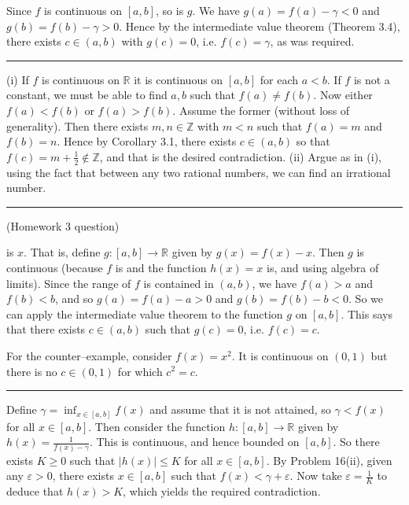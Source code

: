 \documentclass[letterpaper,10pt,english]{jupyterBook}
\begin{document}
\sphinxAtStartPar
{\hyperref[\detokenize{Problems:id24}]{}} Since \(f\) is continuous on \([a, b]\), so is \(g\). We have \(g(a) = f(a) - \gamma < 0\) and \(g(b) = f(b) - \gamma > 0\). Hence by the intermediate value theorem (Theorem 3.4), there exists \(c \in (a, b)\) with \(g(c) = 0\), i.e. \(f(c) = \gamma\), as was required.


\bigskip\hrule\bigskip


\sphinxAtStartPar
{\hyperref[\detokenize{Problems:id25}]{}}
(i) If \(f\) is continuous on \(\mathbb{R}\) it is continuous on \([a, b]\) for each \(a < b\). If \(f\) is not a constant, we must be able to find \(a, b\) such that \(f(a) \neq f(b)\). Now either \(f(a) < f(b)\) or \(f(a) > f(b)\). Assume the former (without loss of generality). Then there exists \(m, n \in \mathbb{Z}\) with \(m < n\) such that \(f(a) = m\) and \(f(b) = n\). Hence by Corollary 3.1, there exists \(c \in (a, b)\) so that \(f(c) = m + \frac{1}{2} \notin\mathbb{Z}\), and that is the desired contradiction.
(ii) Argue as in (i), using the fact that between any two rational numbers, we can find an irrational number.


\bigskip\hrule\bigskip


\sphinxAtStartPar
{\hyperref[\detokenize{Problems:id26}]{}} (Homework 3 question)

 is \(x\). That is, define \(g:[a,b]\to\mathbb{R}\) given by \(g(x) = f(x) - x\). Then \(g\) is continuous (because \(f\) is and the function \(h(x)=x\) is, and using algebra of limits). Since the range of \(f\) is contained in \((a, b)\), we have \(f(a) > a\) and \(f(b) < b\), and so \(g(a) = f(a) - a > 0\) and \(g(b) = f(b) - b < 0\). So we can apply the intermediate value theorem to the function \(g\) on \([a,b]\). This says that there exists \(c \in (a, b)\) such that \(g(c) = 0\), i.e. \(f(c) = c\).

For the counter–example, consider \(f(x) = x^2\). It is continuous on \((0, 1)\) but there is no \(c \in (0, 1)\) for which \(c^2 = c\).


\bigskip\hrule\bigskip


\sphinxAtStartPar
{\hyperref[\detokenize{Problems:id27}]{}} Define \(\gamma = \inf_{x \in [a, b]}f(x)\) and assume that it is not attained, so \(\gamma < f(x)\) for all \(x \in [a,b]\). Then consider the function \(h:[a,b]\to \mathbb{R}\) given by \(h(x) = \displaystyle\frac{1}{f(x) - \gamma}\). This is continuous, and hence bounded on \([a, b]\). So there exists \(K \geq 0\) such that \(|h(x)| \leq K\) for all \(x \in [a, b]\). By Problem 16(ii), given any \(\varepsilon > 0\), there exists \(x \in [a, b]\) such that \(f(x) < \gamma + \varepsilon\). Now take \(\varepsilon = \frac{1}{K}\) to deduce that \(h(x) > K\), which yields the required contradiction.
\end{document}
